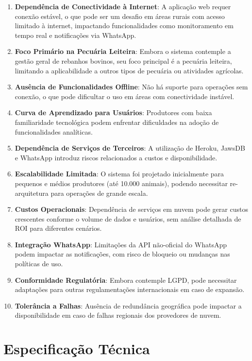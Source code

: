 \documentclass[12pt, a4paper]{article}
\begin{document}
\begin{spacing}{1.5}
\begin{spacing}{1.5}
\begin{enumerate}[label=\alph*)]
    \item \textbf{Dependência de Conectividade à Internet}: A aplicação web requer conexão estável, o que pode ser um desafio em áreas rurais com acesso limitado à internet, impactando funcionalidades como monitoramento em tempo real e notificações via WhatsApp.
    \item \textbf{Foco Primário na Pecuária Leiteira}: Embora o sistema contemple a gestão geral de rebanhos bovinos, seu foco principal é a pecuária leiteira, limitando a aplicabilidade a outros tipos de pecuária ou atividades agrícolas.
    \item \textbf{Ausência de Funcionalidades Offline}: Não há suporte para operações sem conexão, o que pode dificultar o uso em áreas com conectividade instável.
    \item \textbf{Curva de Aprendizado para Usuários}: Produtores com baixa familiaridade tecnológica podem enfrentar dificuldades na adoção de funcionalidades analíticas.
    \item \textbf{Dependência de Serviços de Terceiros}: A utilização de Heroku, JawsDB e WhatsApp introduz riscos relacionados a custos e disponibilidade.
    \item \textbf{Escalabilidade Limitada}: O sistema foi projetado inicialmente para pequenos e médios produtores (até 10.000 animais), podendo necessitar re-arquitetura para operações de grande escala.
    \item \textbf{Custos Operacionais}: Dependência de serviços em nuvem pode gerar custos crescentes conforme o volume de dados e usuários, sem análise detalhada de ROI para diferentes cenários.
    \item \textbf{Integração WhatsApp}: Limitações da API não-oficial do WhatsApp podem impactar as notificações, com risco de bloqueio ou mudanças nas políticas de uso.
    \item \textbf{Conformidade Regulatória}: Embora contemple LGPD, pode necessitar adaptações para outras regulamentações internacionais em caso de expansão.
    \item \textbf{Tolerância a Falhas}: Ausência de redundância geográfica pode impactar a disponibilidade em caso de falhas regionais dos provedores de nuvem.
\end{enumerate}
\end{spacing}

\section{Especificação Técnica}


\end{spacing}
\end{document}
